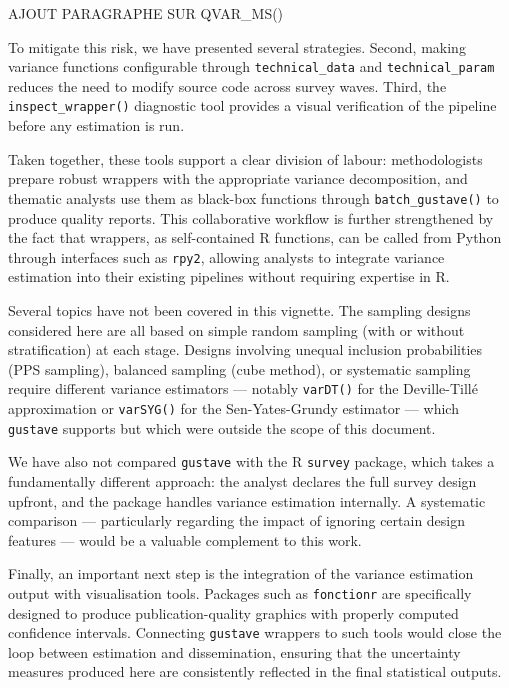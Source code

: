 \documentclass[
]{article}
\begin{document}
AJOUT PARAGRAPHE SUR QVAR\_MS()

To mitigate this risk, we have presented several strategies. Second,
making variance functions configurable through \texttt{technical\_data}
and \texttt{technical\_param} reduces the need to modify source code
across survey waves. Third, the \texttt{inspect\_wrapper()} diagnostic
tool provides a visual verification of the pipeline before any
estimation is run.

Taken together, these tools support a clear division of labour:
methodologists prepare robust wrappers with the appropriate variance
decomposition, and thematic analysts use them as black-box functions
through \texttt{batch\_gustave()} to produce quality reports. This
collaborative workflow is further strengthened by the fact that
wrappers, as self-contained R functions, can be called from Python
through interfaces such as \texttt{rpy2}, allowing analysts to integrate
variance estimation into their existing pipelines without requiring
expertise in R.

Several topics have not been covered in this vignette. The sampling
designs considered here are all based on simple random sampling (with or
without stratification) at each stage. Designs involving unequal
inclusion probabilities (PPS sampling), balanced sampling (cube method),
or systematic sampling require different variance estimators --- notably
\texttt{varDT()} for the Deville-Tillé approximation or
\texttt{varSYG()} for the Sen-Yates-Grundy estimator --- which
\texttt{gustave} supports but which were outside the scope of this
document.

We have also not compared \texttt{gustave} with the R \texttt{survey}
package, which takes a fundamentally different approach: the analyst
declares the full survey design upfront, and the package handles
variance estimation internally. A systematic comparison --- particularly
regarding the impact of ignoring certain design features --- would be a
valuable complement to this work.

Finally, an important next step is the integration of the variance
estimation output with visualisation tools. Packages such as
\texttt{fonctionr} are specifically designed to produce
publication-quality graphics with properly computed confidence
intervals. Connecting \texttt{gustave} wrappers to such tools would
close the loop between estimation and dissemination, ensuring that the
uncertainty measures produced here are consistently reflected in the
final statistical outputs.
\end{document}
